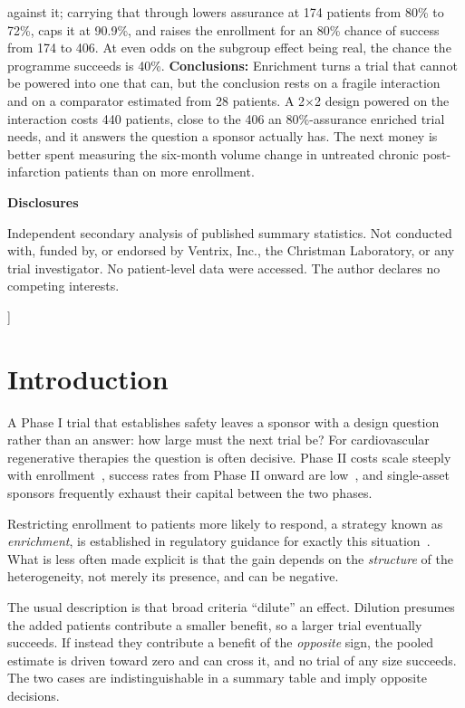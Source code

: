 \documentclass[10pt,twocolumn,letterpaper]{article}
\begin{document}
\begin{@twocolumnfalse}
    against it; carrying that through lowers assurance at 174 patients from 80\% to 72\%, caps it at
    90.9\%, and raises the enrollment for an 80\% chance of success from 174 to 406. At even odds on
    the subgroup effect being real, the chance the programme succeeds is 40\%.
    \textbf{Conclusions:} Enrichment turns a trial that cannot be powered into one that can, but the
    conclusion rests on a fragile interaction and on a comparator estimated from 28 patients. A
    2$\times$2 design powered on the interaction costs 440 patients, close to the 406 an
    80\%-assurance enriched trial needs, and it answers the question a sponsor actually has. The
    next money is better spent measuring the six-month volume change in untreated chronic
    post-infarction patients than on more enrollment.
    \vspace{0.35cm}

    \begin{center}\large\textbf{Disclosures}\end{center}
    \noindent\small Independent secondary analysis of published summary statistics. Not conducted
    with, funded by, or endorsed by Ventrix, Inc., the Christman Laboratory, or any trial
    investigator. No patient-level data were accessed. The author declares no competing interests.
    \vspace{0.5cm}
  \end{@twocolumnfalse}
]

\section{Introduction}

A Phase I trial that establishes safety leaves a sponsor with a design question rather than an
answer: how large must the next trial be? For cardiovascular regenerative therapies the question is
often decisive. Phase II costs scale steeply with enrollment~\cite{moore2018}, success rates from
Phase II onward are low~\cite{wong2019}, and single-asset sponsors frequently exhaust their capital
between the two phases.

Restricting enrollment to patients more likely to respond, a strategy known as
\emph{enrichment}, is established in regulatory guidance for exactly this situation~\cite{fda2019, temple2010}. What is less
often made explicit is that the gain depends on the \emph{structure} of the heterogeneity, not
merely its presence, and can be negative.

The usual description is that broad criteria ``dilute'' an effect. Dilution presumes the added
patients contribute a smaller benefit, so a larger trial eventually succeeds. If instead they
contribute a benefit of the \emph{opposite} sign, the pooled estimate is driven toward zero and can
cross it, and no trial of any size succeeds. The two cases are indistinguishable in a summary table
and imply opposite decisions.
\end{document}
